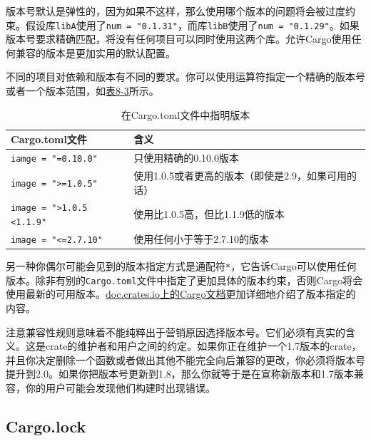 版本号默认是弹性的，因为如果不这样，那么使用哪个版本的问题将会被过度约束。假设库\texttt{libA}使用了\texttt{num = "0.1.31"}，而库\texttt{libB}使用了\texttt{num = "0.1.29"}。如果版本号要求精确匹配，将没有任何项目可以同时使用这两个库。允许Cargo使用任何兼容的版本是更加实用的默认配置。

不同的项目对依赖和版本有不同的要求。你可以使用运算符指定一个精确的版本号或者一个版本范围，如\hyperref[t8-3]{表8-3}所示。

\begin{table}[htbp]
    \centering
    \caption{在Cargo.toml文件中指明版本}
    \label{t8-3}
    \begin{tabular}{p{}p{}}
        \hline
        \textbf{Cargo.toml文件} & \textbf{含义} \\
        \hline
        \texttt{iamge = "=0.10.0"}  & 只使用精确的0.10.0版本 \\
        \rowcolor{tablecolor}
        \texttt{image = ">=1.0.5"}  & 使用1.0.5或者更高的版本（即使是2.9，如果可用的话） \\
        \texttt{image = ">1.0.5 <1.1.9"} & 使用比1.0.5高，但比1.1.9低的版本 \\
        \rowcolor{tablecolor}
        \texttt{image = "<=2.7.10"} & 使用任何小于等于2.7.10的版本 \\
    \end{tabular}
\end{table}

另一种你偶尔可能会见到的版本指定方式是通配符\texttt{*}，它告诉Cargo可以使用任何版本。除非有别的\texttt{Cargo.toml}文件中指定了更加具体的版本约束，否则Cargo将会使用最新的可用版本。\href{https://doc.rust-lang.org/cargo/reference/specifying-dependencies.html}{doc.crates.io上的Cargo文档}更加详细地介绍了版本指定的内容。

注意兼容性规则意味着不能纯粹出于营销原因选择版本号。它们必须有真实的含义。这是crate的维护者和用户之间的约定。如果你正在维护一个1.7版本的crate，并且你决定删除一个函数或者做出其他不能完全向后兼容的更改，你必须将版本号提升到2.0。如果你把版本号更新到1.8，那么你就等于是在宣称新版本和1.7版本兼容，你的用户可能会发现他们构建时出现错误。

\subsection{Cargo.lock}























